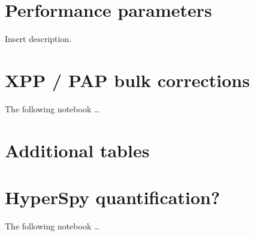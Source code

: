 



\section{Performance parameters}
\label{appendix:performance}

Insert description.


\section{XPP / PAP bulk corrections}
\label{appendix:xpp}

The following notebook \dots
% 



\section{Additional tables}
\label{appendix:tables}








\section{HyperSpy quantification?}
\label{appendix:HSquant}

The following notebook \dots
% 